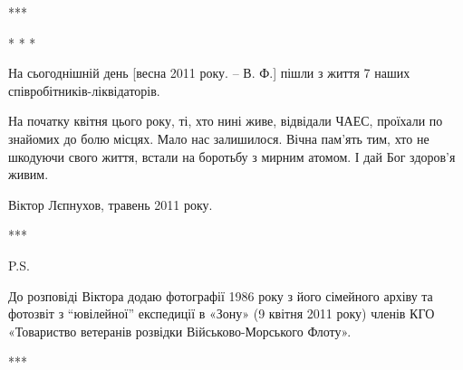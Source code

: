 ***

* * *

На сьогоднішній день [весна 2011 року. – В. Ф.] пішли з життя 7 наших
співробітників-ліквідаторів. 

На початку квітня цього року, ті, хто нині живе, відвідали ЧАЕС, проїхали по
знайомих до болю місцях. Мало нас залишилося. Вічна пам'ять тим, хто не
шкодуючи свого життя, встали на боротьбу з мирним атомом. І дай Бог здоров'я
живим.

Віктор Лєпнухов, травень 2011 року.

***

P.S.

До розповіді Віктора додаю фотографії 1986 року з його сімейного архіву та
фотозвіт з \enquote{ювілейної} експедиції в «Зону» (9 квітня 2011 року) членів КГО
«Товариство ветеранів розвідки Військово-Морського Флоту».

***

